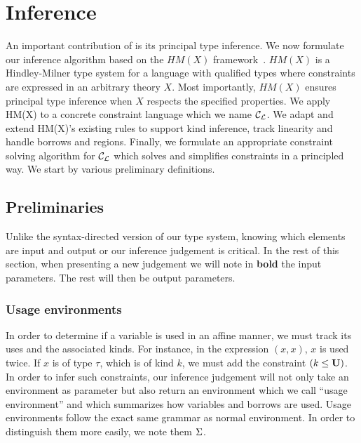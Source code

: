 \section{Inference}
\label{inference}

An important contribution of \affe is its principal type inference.
We now formulate our inference algorithm
based on the $HM(X)$ framework~\citep{DBLP:journals/tapos/OderskySW99}.
$HM(X)$ is a Hindley-Milner type system for a language
with qualified types where constraints are expressed in an arbitrary
theory $X$.
Most importantly,
$HM(X)$ ensures principal type inference
when $X$ respects the specified properties.
We apply HM(X) to a concrete constraint language which we name ${\mathcal C_{\mathcal L}}$.
We adapt and extend HM(X)'s existing rules to support kind inference,
track linearity and handle borrows and regions. Finally, we
formulate an appropriate constraint solving algorithm for ${\mathcal C_{\mathcal L}}$
which solves and simplifies constraints in a principled way.
We start by various preliminary definitions.

\subsection{Preliminaries}

Unlike the syntax-directed version of our type system, knowing which elements
are input and output or our inference judgement is critical. In the rest
of this section, when presenting a new judgement
we will note in \textbf{bold} the input parameters. The rest will then be
output parameters.

\subsubsection{Usage environments}


In order to determine if a variable is used in an affine manner, we must track
its uses and the associated kinds. For instance, in the expression
$(x,x)$, $x$ is used twice. If $x$ is of type $\tau$, which is of kind $k$,
we must add the constraint $(k \leq \mathbf{U})$.
%
In order to infer such constraints, our inference judgement will not only
take an environment as parameter but also return an environment which
we call ``usage environment'' and which summarizes how variables and borrows
are used. Usage environments follow the exact same grammar
as normal environment. In order to distinguish them more easily,
we note them $\Sigma$.

